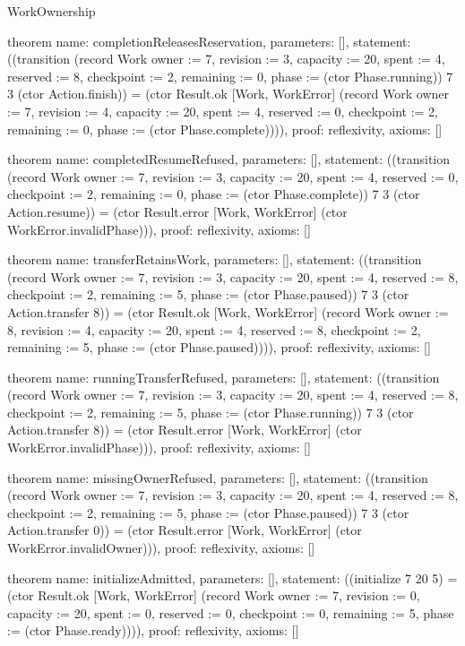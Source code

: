 \begin{lexlean}{WorkOwnership}
\begin{semanticmodule}
theorem{
  name: completionReleasesReservation,
  parameters: [],
  statement: ((transition (record Work {owner := 7, revision := 3, capacity := 20, spent := 4, reserved := 8, checkpoint := 2, remaining := 0, phase := (ctor Phase.running)}) 7 3 (ctor Action.finish)) = (ctor Result.ok [Work, WorkError] (record Work {owner := 7, revision := 4, capacity := 20, spent := 4, reserved := 0, checkpoint := 2, remaining := 0, phase := (ctor Phase.complete)}))),
  proof: reflexivity{},
  axioms: []
}

theorem{
  name: completedResumeRefused,
  parameters: [],
  statement: ((transition (record Work {owner := 7, revision := 3, capacity := 20, spent := 4, reserved := 0, checkpoint := 2, remaining := 0, phase := (ctor Phase.complete)}) 7 3 (ctor Action.resume)) = (ctor Result.error [Work, WorkError] (ctor WorkError.invalidPhase))),
  proof: reflexivity{},
  axioms: []
}

theorem{
  name: transferRetainsWork,
  parameters: [],
  statement: ((transition (record Work {owner := 7, revision := 3, capacity := 20, spent := 4, reserved := 8, checkpoint := 2, remaining := 5, phase := (ctor Phase.paused)}) 7 3 (ctor Action.transfer 8)) = (ctor Result.ok [Work, WorkError] (record Work {owner := 8, revision := 4, capacity := 20, spent := 4, reserved := 8, checkpoint := 2, remaining := 5, phase := (ctor Phase.paused)}))),
  proof: reflexivity{},
  axioms: []
}

theorem{
  name: runningTransferRefused,
  parameters: [],
  statement: ((transition (record Work {owner := 7, revision := 3, capacity := 20, spent := 4, reserved := 8, checkpoint := 2, remaining := 5, phase := (ctor Phase.running)}) 7 3 (ctor Action.transfer 8)) = (ctor Result.error [Work, WorkError] (ctor WorkError.invalidPhase))),
  proof: reflexivity{},
  axioms: []
}

theorem{
  name: missingOwnerRefused,
  parameters: [],
  statement: ((transition (record Work {owner := 7, revision := 3, capacity := 20, spent := 4, reserved := 8, checkpoint := 2, remaining := 5, phase := (ctor Phase.paused)}) 7 3 (ctor Action.transfer 0)) = (ctor Result.error [Work, WorkError] (ctor WorkError.invalidOwner))),
  proof: reflexivity{},
  axioms: []
}

theorem{
  name: initializeAdmitted,
  parameters: [],
  statement: ((initialize 7 20 5) = (ctor Result.ok [Work, WorkError] (record Work {owner := 7, revision := 0, capacity := 20, spent := 0, reserved := 0, checkpoint := 0, remaining := 5, phase := (ctor Phase.ready)}))),
  proof: reflexivity{},
  axioms: []
}


\end{semanticmodule}
\end{lexlean}

